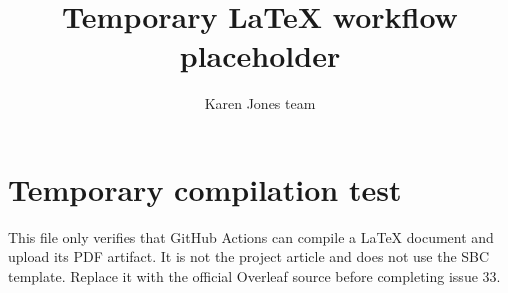 \documentclass{article}
\title{Temporary LaTeX workflow placeholder}
\author{Karen Jones team}
\date{}
\begin{document}
\maketitle

\section*{Temporary compilation test}

This file only verifies that GitHub Actions can compile a LaTeX document and
upload its PDF artifact. It is not the project article and does not use the
SBC template. Replace it with the official Overleaf source before completing
issue 33.
\end{document}
